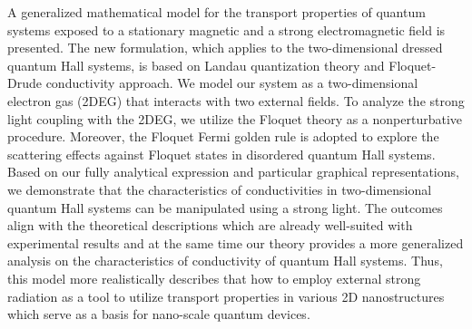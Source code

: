 A generalized mathematical model for the transport properties of quantum systems exposed to a stationary magnetic and a strong electromagnetic field is presented. The new formulation, which applies to the two-dimensional dressed quantum Hall systems, is based on Landau quantization theory and Floquet-Drude conductivity approach. We model our system as a two-dimensional electron gas (2DEG) that interacts with two external fields. To analyze the strong light coupling with the 2DEG, we utilize the Floquet theory as a nonperturbative procedure. Moreover, the Floquet Fermi golden rule is adopted to explore the scattering effects against Floquet states in disordered quantum Hall systems. Based on our fully analytical expression and particular graphical representations, we demonstrate that the characteristics of conductivities in two-dimensional quantum Hall systems can be manipulated using a strong light. The outcomes align with the theoretical descriptions which are already well-suited with experimental results and at the same time our theory provides a more generalized analysis on the characteristics of conductivity of quantum Hall systems. Thus, this model more realistically describes that how to employ external strong radiation as a tool to utilize transport properties in various 2D nanostructures which serve as a basis for nano-scale quantum devices.
